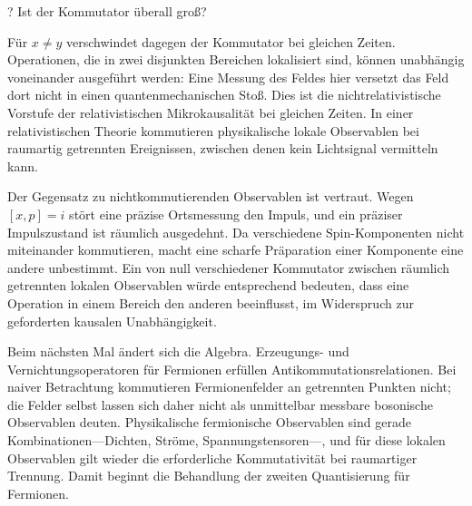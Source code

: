 \begin{classroomqa}? Ist der Kommutator überall groß?\end{classroomqa}

Für \(x\neq y\) verschwindet dagegen der Kommutator bei gleichen Zeiten. Operationen, die in zwei disjunkten Bereichen lokalisiert sind, können unabhängig voneinander ausgeführt werden: Eine Messung des Feldes hier versetzt das Feld dort nicht in einen quantenmechanischen Stoß. Dies ist die nichtrelativistische Vorstufe der relativistischen Mikrokausalität bei gleichen Zeiten. In einer relativistischen Theorie kommutieren physikalische lokale Observablen bei raumartig getrennten Ereignissen, zwischen denen kein Lichtsignal vermitteln kann.

Der Gegensatz zu nichtkommutierenden Observablen ist vertraut. Wegen \([x,p]=i\) stört eine präzise Ortsmessung den Impuls, und ein präziser Impulszustand ist räumlich ausgedehnt. Da verschiedene Spin-Komponenten nicht miteinander kommutieren, macht eine scharfe Präparation einer Komponente eine andere unbestimmt. Ein von null verschiedener Kommutator zwischen räumlich getrennten lokalen Observablen würde entsprechend bedeuten, dass eine Operation in einem Bereich den anderen beeinflusst, im Widerspruch zur geforderten kausalen Unabhängigkeit.

\begin{classroomqa}\end{classroomqa}

Beim nächsten Mal ändert sich die Algebra. Erzeugungs- und Vernichtungsoperatoren für Fermionen erfüllen Antikommutationsrelationen. Bei naiver Betrachtung kommutieren Fermionenfelder an getrennten Punkten nicht; die Felder selbst lassen sich daher nicht als unmittelbar messbare bosonische Observablen deuten. Physikalische fermionische Observablen sind gerade Kombinationen---Dichten, Ströme, Spannungstensoren---, und für diese lokalen Observablen gilt wieder die erforderliche Kommutativität bei raumartiger Trennung. Damit beginnt die Behandlung der zweiten Quantisierung für Fermionen.
